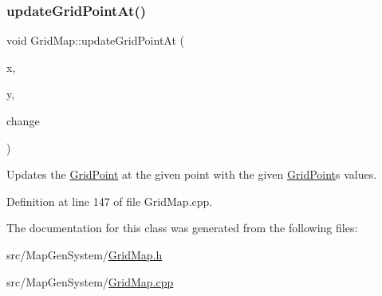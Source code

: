 \mbox{\label{class_world_architect_1_1_grid_map_a67735350af692d4e42fe83e21c0cbe04}} 
\subsubsection{\texorpdfstring{updateGridPointAt()}{updateGridPointAt()}}
{\footnotesize\ttfamily void Grid\+Map\+::update\+Grid\+Point\+At (\begin{DoxyParamCaption}\item[{int}]{x,  }\item[{int}]{y,  }\item[{\mbox{\hyperlink{struct_world_architect_1_1_grid_point}{Grid\+Point}} $\ast$}]{change }\end{DoxyParamCaption})}



Updates the \mbox{\hyperlink{struct_world_architect_1_1_grid_point}{Grid\+Point}} at the given point with the given \mbox{\hyperlink{struct_world_architect_1_1_grid_point}{Grid\+Point}}\textquotesingle{}s values. 



Definition at line 147 of file Grid\+Map.\+cpp.



The documentation for this class was generated from the following files\+:\begin{DoxyCompactItemize}
\item 
src/\+Map\+Gen\+System/\mbox{\hyperlink{_grid_map_8h}{Grid\+Map.\+h}}\item 
src/\+Map\+Gen\+System/\mbox{\hyperlink{_grid_map_8cpp}{Grid\+Map.\+cpp}}\end{DoxyCompactItemize}
